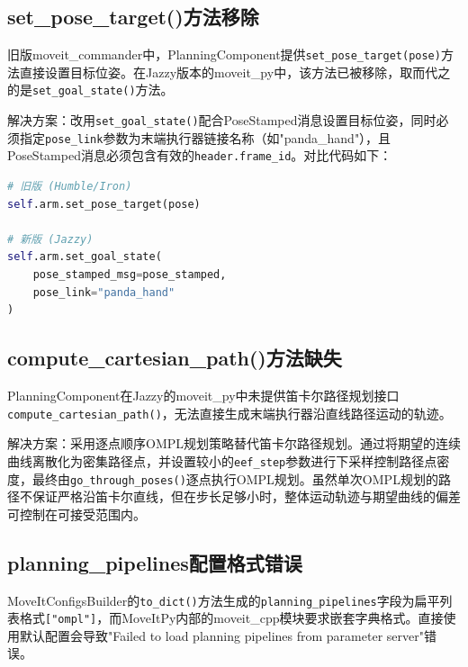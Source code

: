 \documentclass[a4paper,12pt]{ctexart}
\newcommand{\bodytext}{\fontsize{12pt}{20pt}\selectfont\setlength{\parskip}{0pt}}
\begin{document}
\subsection{set\_pose\_target()方法移除}

\bodytext

旧版moveit\_commander中，PlanningComponent提供\texttt{set\_pose\_target(pose)}方法直接设置目标位姿。在Jazzy版本的moveit\_py中，该方法已被移除，取而代之的是\texttt{set\_goal\_state()}方法。

解决方案：改用\texttt{set\_goal\_state()}配合PoseStamped消息设置目标位姿，同时必须指定\texttt{pose\_link}参数为末端执行器链接名称（如"panda\_hand"），且PoseStamped消息必须包含有效的\texttt{header.frame\_id}。对比代码如下：

\begin{lstlisting}[language=Python, caption={set\_pose\_target()替换方案}]
# 旧版 (Humble/Iron)
self.arm.set_pose_target(pose)

# 新版 (Jazzy)
self.arm.set_goal_state(
    pose_stamped_msg=pose_stamped,
    pose_link="panda_hand"
)
\end{lstlisting}

\subsection{compute\_cartesian\_path()方法缺失}

\bodytext

PlanningComponent在Jazzy的moveit\_py中未提供笛卡尔路径规划接口\texttt{compute\_cartesian\_path()}，无法直接生成末端执行器沿直线路径运动的轨迹。

解决方案：采用逐点顺序OMPL规划策略替代笛卡尔路径规划。通过将期望的连续曲线离散化为密集路径点，并设置较小的\texttt{eef\_step}参数进行下采样控制路径点密度，最终由\texttt{go\_through\_poses()}逐点执行OMPL规划。虽然单次OMPL规划的路径不保证严格沿笛卡尔直线，但在步长足够小时，整体运动轨迹与期望曲线的偏差可控制在可接受范围内。

\subsection{planning\_pipelines配置格式错误}

\bodytext

MoveItConfigsBuilder的\texttt{to\_dict()}方法生成的\texttt{planning\_pipelines}字段为扁平列表格式\texttt{["ompl"]}，而MoveItPy内部的moveit\_cpp模块要求嵌套字典格式。直接使用默认配置会导致"Failed to load planning pipelines from parameter server"错误。
\end{document}
